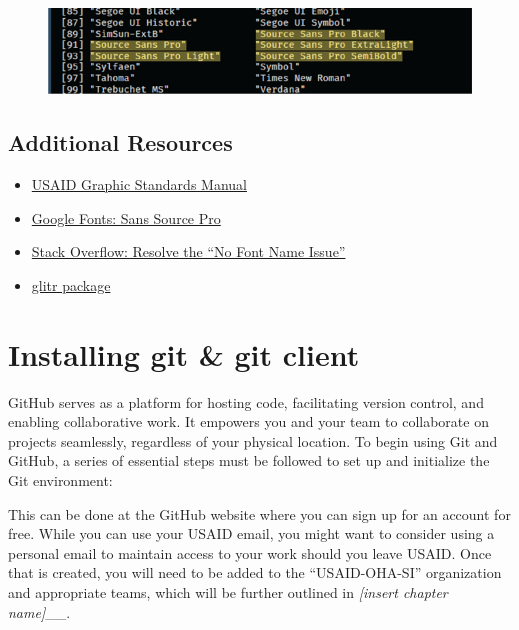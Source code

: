 \documentclass[
  letterpaper,
  DIV=11,
  numbers=noendperiod]{scrreprt}
\providecommand{\tightlist}{%
  \setlength{\itemsep}{0pt}\setlength{\parskip}{0pt}}\usepackage{longtable,booktabs,array}
\begin{document}
\begin{figure}

{\centering \includegraphics{./images/typeface_setup-typeface_installed.png}

}

\end{figure}

\hypertarget{additional-resources-1}{%
\section{Additional Resources}\label{additional-resources-1}}

\begin{itemize}
\tightlist
\item
  \href{https://www.usaid.gov/branding/gsm}{USAID Graphic Standards
  Manual}
\item
  \href{https://fonts.google.com/specimen/Source+Sans+Pro}{Google Fonts:
  Sans Source Pro}
\item
  \href{https://stackoverflow.com/questions/61204259/how-can-i-resolve-the-no-font-name-issue-when-importing-fonts-into-r-using-ext/68642855\#68642855}{Stack
  Overflow: Resolve the ``No Font Name Issue''}
\item
  \href{https://usaid-oha-si.github.io/glitr/}{glitr package}
\end{itemize}


\hypertarget{installing-git-git-client}{%
\chapter{Installing git \& git client}\label{installing-git-git-client}}

GitHub serves as a platform for hosting code, facilitating version
control, and enabling collaborative work. It empowers you and your team
to collaborate on projects seamlessly, regardless of your physical
location. To begin using Git and GitHub, a series of essential steps
must be followed to set up and initialize the Git environment:

This can be done at the GitHub website where you can sign up for an
account for free. While you can use your USAID email, you might want to
consider using a personal email to maintain access to your work should
you leave USAID. Once that is created, you will need to be added to the
``USAID-OHA-SI'' organization and appropriate teams, which will be
further outlined in \emph{{[}insert chapter name{]}}\_\_.
\end{document}
